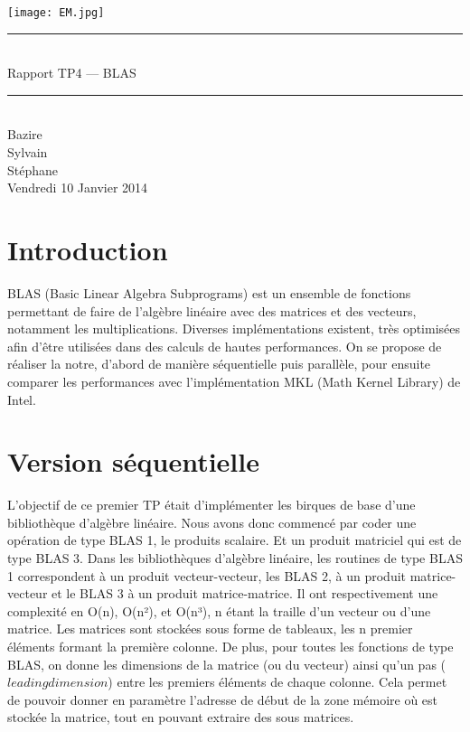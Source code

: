 \documentclass[a4paper,11pt]{article}
\begin{document}
\begin{titlepage}
  \begin{center}

    \begin{center}
      \texttt{[image: EM.jpg]}
    \end{center}

    \vspace*{1cm}
        
    \rule{0.75\linewidth}{0.7mm}\\[0.4cm]
    {\Huge Rapport TP4 --- BLAS\\[0.4cm]}
    \rule{0.75\linewidth}{0.7mm} \\[1.5cm]

    {\Large Bazire \\Sylvain {}\\Stéphane \\[2cm]}
    {\Large Vendredi 10 Janvier 2014}
  \end{center}
\end{titlepage}

\tableofcontents
\clearpage
\section{Introduction}

BLAS (Basic Linear Algebra Subprograms) est un ensemble de fonctions permettant de faire de l'algèbre linéaire avec des matrices et des vecteurs, notamment les multiplications. Diverses implémentations existent, très optimisées afin d'être utilisées dans des calculs de hautes performances. On se propose de réaliser la notre, d'abord de manière séquentielle puis parallèle, pour ensuite comparer les performances avec l'implémentation MKL (Math Kernel Library) de Intel.

\section{Version séquentielle}
L'objectif de ce premier TP était d'implémenter les birques de base d'une bibliothèque d'algèbre linéaire. Nous avons donc commencé par coder une opération de type BLAS 1, le produits scalaire. Et un produit matriciel qui est de type BLAS 3.
Dans les bibliothèques d'algèbre linéaire, les routines de type BLAS 1 correspondent à un produit vecteur-vecteur, les BLAS 2, à un produit matrice-vecteur et le BLAS 3 à un produit matrice-matrice. Il ont respectivement une complexité en O(n), O(n²), et O(n³), n étant la traille d'un vecteur ou d'une matrice.
Les matrices sont stockées sous forme de tableaux, les n premier éléments formant la première colonne. De plus, pour toutes les fonctions de type BLAS, on donne les dimensions de la matrice (ou du vecteur) ainsi qu'un pas ($leading dimension$) entre les premiers éléments de chaque colonne. Cela permet de pouvoir donner en paramètre l'adresse de début de la zone mémoire où est stockée la matrice, tout en pouvant extraire des sous matrices.
\end{document}
